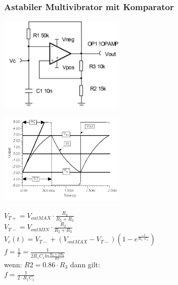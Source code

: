 \subsubsection{Astabiler Multivibrator mit Komparator}
	\begin{multicols}{3}
		\includegraphics[width=6cm]{images/osziRechteck.png}
		\columnbreak
		
		\includegraphics[width=6cm]{images/osziRechteckSignal.png}
		\columnbreak
		
		$V_{T+}=V_{outMAX}\cdot\frac{R_2}{R_2+R_3}$\\
		$V_{T-}=V_{outMIN}\cdot\frac{R_2}{R_2+R_3}$\\
		$V_c(t)=V_{T-}+\left(V_{outMAX}-V_{T-}\right)\left(1-e^{\frac{-t}{R_1\cdot
		C_1}}\right)$\\
		$f=\frac{1}{T}=\frac{1}{2R_1C_1 ln \frac{R_3+2R_2}{R3}}$\\
		wenn: $R2 = 0.86 \cdot R_3$ dann gilt:\\
		$f=\frac{1}{2\cdot R_1C_1}$
	\end{multicols}
